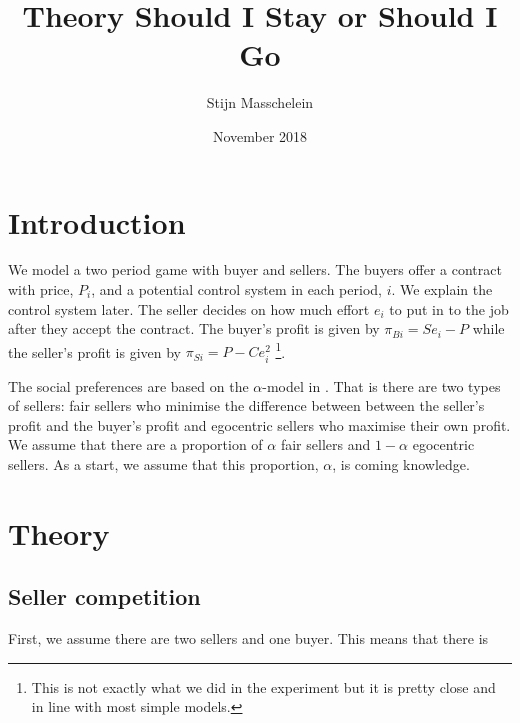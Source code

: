 \documentclass{article}
\title{Theory Should I Stay or Should I Go}
\author{Stijn Masschelein}
\date{November 2018}
\begin{document}
\maketitle

\section{Introduction}

We model a two period game with buyer and sellers. The buyers offer a contract with price, $P_i$, and a potential control system in each period, $i$. We explain the control system later. The seller decides on how much effort $e_i$ to put in to the job after they accept the contract. The buyer's profit is given by $\pi_{Bi} = Se_i - P$ while the seller's profit is given by $\pi_{Si} = P - C e_i^2$ \footnote{This is not exactly what we did in the experiment but it is pretty close and in line with most simple models.}.

The social preferences are based on the $\alpha$-model in \citep{Bolton2008a}. That is there are two types of sellers: fair sellers who minimise the difference between between the seller's profit and the buyer's profit and egocentric sellers who maximise their own profit. We assume that there are a proportion of $\alpha$ fair sellers and $1-\alpha$ egocentric sellers. As a start, we assume that this proportion, $\alpha$, is coming knowledge.

\section{Theory}

\subsection{Seller competition}

First, we assume there are two sellers and one buyer. This means that there is 




\end{document}
